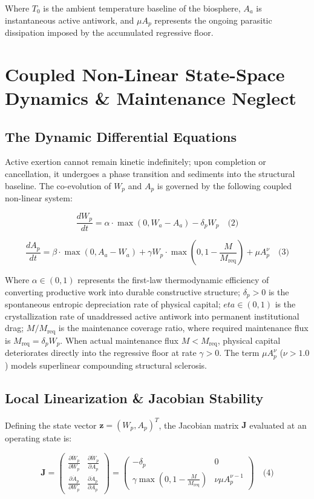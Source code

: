 \documentclass[preprint,12pt,authoryear]{elsarticle}
\theoremstyle{definition}
\begin{document}
Where $T_0$ is the ambient temperature baseline of the biosphere, $A_a$ is instantaneous active antiwork, and $\mu A_p$ represents the ongoing parasitic dissipation imposed by the accumulated regressive floor.

\section{Coupled Non-Linear State-Space Dynamics \& Maintenance Neglect}

\subsection{The Dynamic Differential Equations}

Active exertion cannot remain kinetic indefinitely; upon completion or cancellation, it undergoes a phase transition and sediments into the structural baseline. The co-evolution of $W_p$ and $A_p$ is governed by the following coupled non-linear system:

$$ \frac{dW_p}{dt} =  \alpha \cdot \max(0, W_a - A_a) - \delta_p W_p \quad \text{(2)}$$

$$ \frac{dA_p}{dt} =  \beta \cdot \max(0, A_a - W_a) + \gamma W_p \cdot \max\left(0, 1 - \frac{M}{M_{ \text{req}}} \right) + \mu A_p^\nu \quad \text{(3)}$$

Where $ \alpha \in (0, 1)$ represents the first-law thermodynamic efficiency of converting productive work into durable constructive structure; $\delta_p > 0$ is the spontaneous entropic depreciation rate of physical capital; $ eta \in (0, 1)$ is the crystallization rate of unaddressed active antiwork into permanent institutional drag; $M / M_{ \text{req}}$ is the maintenance coverage ratio, where required maintenance flux is $M_{ \text{req}} = \delta_p W_p$. When actual maintenance flux $M < M_{ \text{req}}$, physical capital deteriorates directly into the regressive floor at rate $\gamma > 0$. The term $\mu A_p^\nu$ ($\nu > 1.0$) models superlinear compounding structural sclerosis.

\subsection{Local Linearization \& Jacobian Stability}

Defining the state vector $\mathbf{z} = (W_p, A_p)^T$, the Jacobian matrix $\mathbf{J}$ evaluated at an operating state is:

$$\mathbf{J} =  \begin{pmatrix} \frac{\partial \dot{W}_p}{\partial W_p} & \frac{\partial \dot{W}_p}{\partial A_p} \\ \frac{\partial \dot{A}_p}{\partial W_p} & \frac{\partial \dot{A}_p}{\partial A_p} \end{pmatrix} =  \begin{pmatrix} -\delta_p & 0 \\ \gamma \max\left(0, 1 - \frac{M}{M_{ \text{req}}} \right) &\nu \mu A_p^{\nu - 1} \end{pmatrix} \quad \text{(4)}$$
\end{document}
